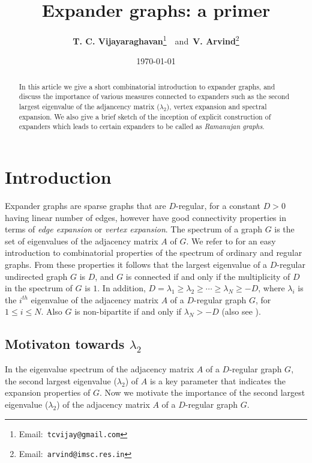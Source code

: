 \documentclass{article}
\title{\bf Expander graphs: a primer}
\author{{{\bf T. C. Vijayaraghavan}\footnote{Email:~\tt tcvijay@gmail.com}}~~and~{{\bf V. Arvind}\footnote{Email:~\tt arvind@imsc.res.in}}}
\date{\today}
\begin{document}
\maketitle

\begin{abstract}
In this article we give a short combinatorial introduction to expander graphs, and discuss the importance of various measures connected to expanders such as the second largest eigenvalue of the adjancency matrix ($\lambda _2$), vertex expansion and spectral expansion. We also give a brief sketch of the inception of explicit construction of expanders which leads to certain expanders to be called as {\it Ramanujan graphs}.
\end{abstract}

\pagestyle{myheadings}
\thispagestyle{plain}
\section{Introduction}
Expander graphs are sparse graphs that are $D$-regular, for a constant $D>0$ having linear number of edges, however have good connectivity properties in terms of {\it edge expansion} or {\it vertex expansion}. The spectrum of a graph $G$ is the set of eigenvalues of the adjacency matrix $A$ of $G$. We refer to \cite[Chapters 2 and 3]{Big1993} for an easy introduction to combinatorial properties of the spectrum of ordinary and regular graphs. From these properties it follows that the largest eigenvalue of a $D$-regular undirected graph $G$ is $D$, and $G$ is connected if and only if the multiplicity of $D$ in the spectrum of $G$ is $1$. In addition, $D=\lambda _1\geq \lambda _2\geq\cdots\geq\lambda _N\geq -D$, where $\lambda _i$ is the $i^{th}$ eigenvalue of the adjacency matrix $A$ of a $D$-regular graph $G$, for $1\leq i\leq N$. Also $G$ is non-bipartite if and only if $\lambda _N>-D$ (also see \cite[pp.15]{KS2011}).

\subsection{Motivaton towards $\lambda _2$}
In the eigenvalue spectrum of the adjacency matrix $A$ of a $D$-regular graph $G$, the second largest eigenvalue ($\lambda _2$) of $A$ is a key parameter that indicates the expansion properties of $G$. Now we motivate the importance of the second largest eigenvalue ($\lambda _2$) of the adjacency matrix $A$ of a $D$-regular graph $G$.
\end{document}
